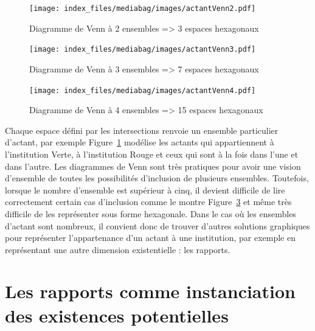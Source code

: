 \documentclass[
  letterpaper,
  DIV=11,
  numbers=noendperiod]{scrreprt}
\begin{document}
\begin{figure}

{\centering \texttt{[image: index\_files/mediabag/images/actantVenn2.pdf]}

}

\caption{\label{fig-hexaVenn2}Diagramme de Venn à 2 ensembles
=\textgreater{} 3 espaces hexagonaux}

\end{figure}

\begin{figure}

{\centering \texttt{[image: index\_files/mediabag/images/actantVenn3.pdf]}

}

\caption{\label{fig-hexaVenn3}Diagramme de Venn à 3 ensembles
=\textgreater{} 7 espaces hexagonaux}

\end{figure}

\begin{figure}

{\centering \texttt{[image: index\_files/mediabag/images/actantVenn4.pdf]}

}

\caption{\label{fig-hexaVenn4}Diagramme de Venn à 4 ensembles
=\textgreater{} 15 espaces hexagonaux}

\end{figure}

Chaque espace défini par les intersections renvoie un ensemble
particulier d'actant, par exemple Figure~\ref{fig-hexaVenn2} modélise
les actants qui appartiennent à l'institution Verte, à l'institution
Rouge et ceux qui sont à la fois dans l'une et dans l'autre. Les
diagrammes de Venn sont très pratiques pour avoir une vision d'ensemble
de toutes les possibilités d'inclusion de plusieurs ensembles.
Toutefois, lorsque le nombre d'ensemble est supérieur à cinq, il devient
difficile de lire correctement certain cas d'inclusion comme le montre
Figure~\ref{fig-hexaVenn4} et même très difficile de les représenter
sous forme hexagonale. Dans le cas où les ensembles d'actant sont
nombreux, il convient donc de trouver d'autres solutions graphiques pour
représenter l'appartenance d'un actant à une institution, par exemple en
représentant une autre dimension existentielle : les rapports.

\hypertarget{sec-rapportsInstExis}{%
\section{Les rapports comme instanciation des existences
potentielles}\label{sec-rapportsInstExis}}
\end{document}
